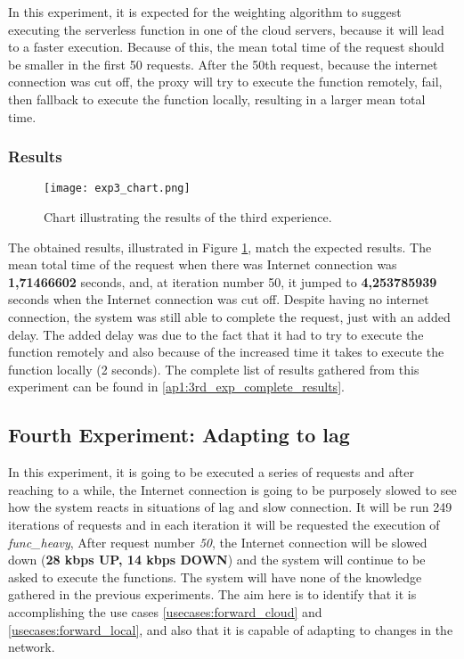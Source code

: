 In this experiment, it is expected for the weighting algorithm to suggest
executing the serverless function in one of the cloud servers, because it will
lead to a faster execution. Because of this, the mean total time of the request should
be smaller in the first 50 requests. After the 50th request, because the internet
connection was cut off, the proxy will try to execute the function remotely, fail,
then fallback to execute the function locally, resulting in a larger mean total
time. 

\subsubsection{Results}

\begin{figure}[h]
  \begin{center}
    \texttt{[image: exp3\_chart.png]}
    \caption{Chart illustrating the results of the third experience.}
    \label{fig:exp3_chart}
  \end{center}
\end{figure}

The obtained results, illustrated in Figure \ref{fig:exp3_chart}, match the
expected results. The mean total time of the request when there was Internet
connection was \textbf{1,71466602} seconds, and, at iteration number 50, it
jumped to \textbf{4,253785939} seconds when the Internet connection was cut off.
Despite having no internet connection, the system was still able to complete the
request, just with an added delay. The added delay was due to the fact that it had
to try to execute the function remotely and also because of the increased time it
takes to execute the function locally (2 seconds). The complete list of results
gathered from this experiment can be found in \ref{ap1:3rd_exp_complete_results}.

\subsection{Fourth Experiment: Adapting to lag}
\label{res:exp4}
In this experiment, it is going to be executed a series of requests and after
reaching to a while, the Internet connection is going to be purposely slowed to
see how the system reacts in situations of lag and slow connection. It will be run
249 iterations of requests and in each iteration it will be requested the
execution of \textit{func\_heavy}, After request number \textit{50}, the Internet
connection will be slowed down (\textbf{28 kbps UP, 14 kbps DOWN}) and the system
will continue to be asked to execute the functions. The system will have none of
the knowledge gathered in the previous experiments. The aim here is to identify
that it is accomplishing the use cases \ref{usecases:forward_cloud} and
\ref{usecases:forward_local}, and also that it is capable of adapting to changes
in the network.

